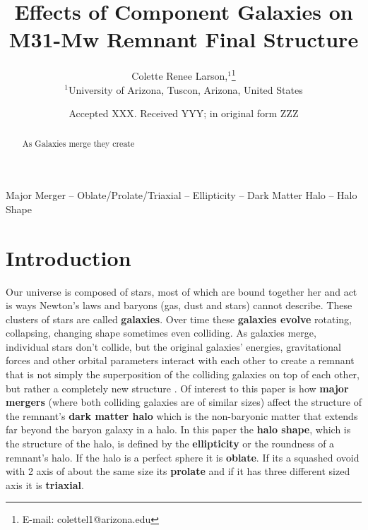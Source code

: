 \documentclass[fleqn,usenatbib]{mnras}
\title[Short title, max. 45 characters]{Effects of Component Galaxies on M31-Mw Remnant Final Structure}
\author[Colette R. Larson]{
Colette Renee Larson,$^{1}$\thanks{E-mail: colettel1@arizona.edu}
\\
$^{1}$University of Arizona, Tuscon, Arizona, United States
}
\date{Accepted XXX. Received YYY; in original form ZZZ}
\begin{document}
\label{firstpage}
\pagerange{\pageref{firstpage}--\pageref{lastpage}}
\maketitle

\begin{abstract}
As Galaxies merge they create 
\end{abstract}

\begin{keywords}
Major Merger -- Oblate/Prolate/Triaxial -- Ellipticity -- Dark Matter Halo -- Halo Shape 
\end{keywords}



\section{Introduction}

Our universe is composed of stars, most of which are bound together her and act is ways Newton's laws and baryons (gas, dust and stars) cannot describe\cite{Willman_2012}. These clusters of stars are called \textbf{galaxies}. Over time these \textbf{galaxies evolve} rotating, collapsing, changing shape sometimes even colliding. As galaxies merge, individual stars don't collide, but the original galaxies’ energies, gravitational forces and other orbital parameters interact with each other to create a remnant that is not simply the superposition of the colliding galaxies on top of each other, but rather a completely new structure \cite{10.1093/mnras/stz1306}. Of interest to this paper is how \textbf{major mergers} (where both colliding galaxies are of similar sizes) affect the structure of the remnant’s \textbf{dark matter halo} which is the non-baryonic matter that extends far beyond the baryon galaxy in a halo. In this paper the \textbf{halo shape}, which is the structure of the halo, is defined by the \textbf{ellipticity} or the roundness of a remnant’s halo. If the halo is a perfect sphere it is \textbf{oblate}. If its a squashed ovoid with 2 axis of about the same size its \textbf{prolate} and if it has three different sized axis it is \textbf{triaxial}.
\end{document}
